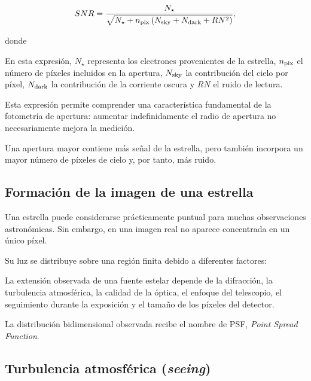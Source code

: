 \documentclass[12pt,letterpaper,oneside]{book}
\begin{document}
\begin{equation}
SNR
=
\frac{N_{\star}}
{
\sqrt{
N_{\star}
+
n_{\rm pix}
\left(
N_{\rm sky}
+
N_{\rm dark}
+
RN^2
\right)
}
},
\end{equation}

donde

En esta expresión, $N_{\star}$ representa los electrones provenientes de la estrella, $n_{\rm pix}$ el número de píxeles incluidos en la apertura, $N_{\rm sky}$ la contribución del cielo por píxel, $N_{\rm dark}$ la contribución de la corriente oscura y $RN$ el ruido de lectura.

Esta expresión permite comprender una característica fundamental de la fotometría de apertura: aumentar indefinidamente el radio de apertura no necesariamente mejora la medición.

Una apertura mayor contiene más señal de la estrella, pero también incorpora un mayor número de píxeles de cielo y, por tanto, más ruido.



\subsection{Formación de la imagen de una estrella}

Una estrella puede considerarse prácticamente puntual para muchas observaciones astronómicas. Sin embargo, en una imagen real no aparece concentrada en un único píxel.

Su luz se distribuye sobre una región finita debido a diferentes factores:

La extensión observada de una fuente estelar depende de la difracción, la turbulencia atmosférica, la calidad de la óptica, el enfoque del telescopio, el seguimiento durante la exposición y el tamaño de los píxeles del detector.

La distribución bidimensional observada recibe el nombre de PSF, \textit{Point Spread Function}.



\subsection{Turbulencia atmosférica (\textit{seeing})}
\end{document}
